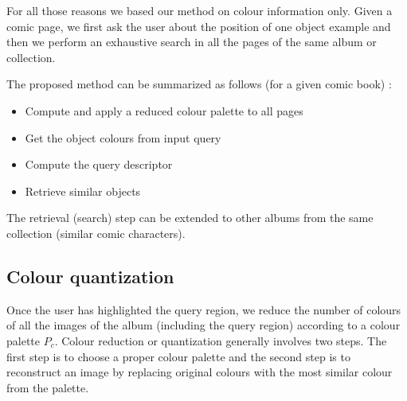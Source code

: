 For all those reasons we based our method on colour information only.
Given a comic page, we first ask the user about the position of one object example and then we perform an exhaustive search in all the pages of the same album or collection.

The proposed method can be summarized as follows (for a given comic book) :
\begin{itemize}
  \item Compute and apply a reduced colour palette to all pages
  \item Get the object colours from input query
  \item Compute the query descriptor
  \item Retrieve similar objects
\end{itemize}

The retrieval (search) step can be extended to other albums from the same collection (similar comic characters).
 


\subsection{Colour quantization}
Once the user has highlighted the query region, we reduce the number of colours of all the images of the album (including the query region) according to a colour palette $P_c$.
Colour reduction or quantization generally involves two steps.
The first step is to choose a proper colour palette and the second step is to reconstruct an image by replacing original colours with the most similar colour from the palette.


